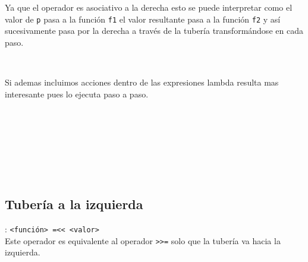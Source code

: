       Ya que el operador es asociativo a la derecha esto se puede interpretar como el valor de \texttt{p} pasa a la función \texttt{f1} el valor resultante pasa a la función \texttt{f2} y así sucesivamente pasa por la derecha a través de la tubería transformándose en cada paso.
      
      \begin{fxcode}
         \\
      \end{fxcode}
      
      Si ademas incluimos acciones dentro de las expresiones lambda resulta mas interesante pues lo ejecuta paso a paso.
      
      \begin{fxcode}
         \\
         \\
         \\
         \\
         \\
         \\
         \outcode{()}
      \end{fxcode}
   
      \subsection*{Tubería a la izquierda}: \texttt{<función>~=\texttt{<}\texttt{<}~<valor>}\\
      Este operador es equivalente al operador \texttt{\texttt{>}\texttt{>}=} solo que la tubería va hacia la izquierda.
      
      \begin{fxcode}
         \\
      \end{fxcode}
      
   
   
   
   
   
   
   
   
   
   
   
   
   
   
   
   
   
   
   
